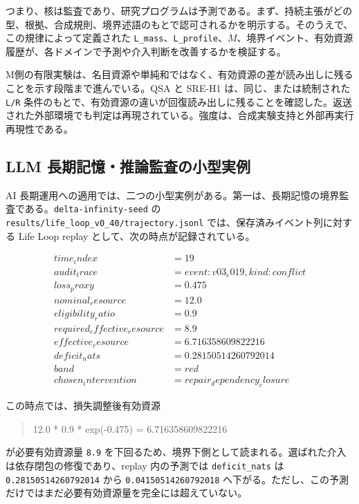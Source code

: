 \documentclass[12pt,a4paper]{article}
\begin{document}
つまり、核は監査であり、研究プログラムは予測である。まず、持続主張がどの型、根拠、合成規則、境界述語のもとで認可されるかを明示する。そのうえで、この規律によって定義された \texttt{L\_mass}、\texttt{L\_profile}、$M$、境界イベント、有効資源履歴が、各ドメインで予測や介入判断を改善するかを検証する。

M側の有限実験は、名目資源や単純和ではなく、有効資源の差が読み出しに残ることを示す段階まで進んでいる。QSA と SRE-H1 は、同じ、または統制された \texttt{L/R} 条件のもとで、有効資源の違いが回復読み出しに残ることを確認した。返送された外部環境でも判定は再現されている。強度は、合成実験支持と外部再実行再現性である。

\subsection{LLM 長期記憶・推論監査の小型実例}\label{llm-ux9577ux671fux8a18ux61b6ux63a8ux8ad6ux76e3ux67fbux306eux5c0fux578bux5b9fux4f8b}

AI 長期運用への適用では、二つの小型実例がある。第一は、長期記憶の境界監査である。\texttt{delta-infinity-seed} の \texttt{results/life\_loop\_v0\_40/trajectory.jsonl} では、保存済みイベント列に対する Life Loop replay として、次の時点が記録されている。

\[
\begin{aligned}
time_index &= 19 \\
audit_trace &= event:v03_e019, kind:conflict \\
loss_proxy &= 0.475 \\
nominal_resource &= 12.0 \\
eligibility_ratio &= 0.9 \\
required_effective_resource &= 8.9 \\
effective_resource &= 6.716358609822216 \\
deficit_nats &= 0.28150514260792014 \\
band &= red \\
chosen_intervention &= repair_dependency_closure
\end{aligned}
\]

この時点では、損失調整後有効資源

\begin{quote}
\small
12.0 * 0.9 * exp(-0.475) = 6.716358609822216
\end{quote}

が必要有効資源量 \texttt{8.9} を下回るため、境界下側として読まれる。選ばれた介入は依存閉包の修復であり、replay 内の予測では \texttt{deficit\_nats} は \texttt{0.28150514260792014} から \texttt{0.04150514260792018} へ下がる。ただし、この予測だけではまだ必要有効資源量を完全には超えていない。
\end{document}
